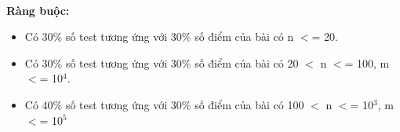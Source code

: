  

\textbf{Ràng buộc:}
\begin{itemize}
	\item Có 30\% số test tương ứng với 30\% số điểm của bài có n $<$= 20.
	\item Có 30\% số test tương ứng với 30\% số điểm của bài có 20 $<$ n $<$= 100, m $<$= 10$^4$.
	\item Có 40\% số test tương ứng với 30\% số điểm của bài có 100 $<$ n $<$= 10$^3$, m $<$= 10$^5$
\end{itemize}
\begin{itemize}
\end{itemize}
